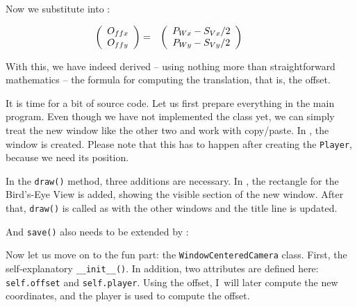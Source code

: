 Now we substitute  into :

\begin{align}
	\left(\begin{array}{c} O_{ffx} \\ O_{ffy} \end{array}\right) &=& \left(\begin{array}{c}   P_{Wx} - S_{Vx} / 2\\  P_{Wy} - S_{Vy} / 2\end{array}\right) & \hspace{0.5cm}\label{off03}
\end{align}

With this, we have indeed derived -- using nothing more than straightforward mathematics -- the formula for computing the translation, that is, the offset.

It is time for a bit of source code. Let us first prepare everything in the main program. Even though we have not implemented the class yet, we can simply treat the new window like the other two and work with copy/paste. In , the window is created. Please note that this has to happen after creating the \texttt{Player}, because we need its position.


In the \texttt{draw()} method, three additions are necessary.  
In , the rectangle for the Bird’s-Eye View is added, showing the visible section of the new window.  
After that, \texttt{draw()} is called as with the other windows and the title line is updated.


And \texttt{save()} also needs to be extended by :


Now let us move on to the fun part: the \texttt{WindowCenteredCamera} class.  
First, the self-explanatory \texttt{\_\_init\_\_()}. In addition, two attributes are defined here: \texttt{self.offset} and \texttt{self.player}.  
Using the offset, I~will later compute the new coordinates, and the player is used to compute the offset.


